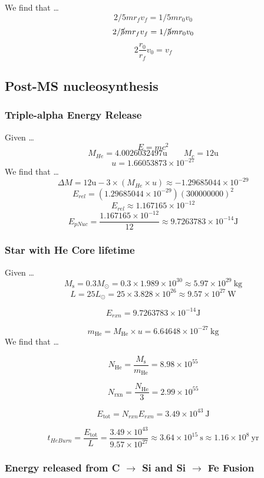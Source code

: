 \documentclass{article}
\begin{document}
We find that \dots
\[2/5 mr_f v_f = 1/5 mr_0 v_0\]
\[2/\cancel{5} mr_f v_f = 1/\cancel{5} mr_0 v_0\]
\[\boxed{2\frac{r_0}{r_f} v_0 = v_f}\]

\subsection{Post-MS nucleosynthesis}
\subsubsection{Triple-alpha Energy Release}
Given \dots
\[E = mc^2\]
\[M_{He} = 4.0026032497 \text{u} \qquad M_c = 12\text{u}\]
\[u = 1.66053873 \times 10^{-27}\]
We find that \dots
\[\Delta M = 12\text{u} - 3 \times (M_{He} \times u) \approx -1.29685044 \times 10^{-29}\]
\[E_{rel} = (1.29685044 \times 10^{-29})(300000000)^2\]
\[E_{rel} \approx1.167165 \times 10^{-12}\]
\[\boxed{E_{pNuc} = \frac{1.167165 \times 10^{-12}}{12} \approx 9.7263783 \times 10^{-14} \text{J}}\]

\subsubsection{Star with He Core lifetime}
Given \dots
\[
M_{\text{s}} = 0.3 M_\odot = 0.3 \times 1.989 \times 10^{30} \approx 5.97 \times 10^{29}\ \mathrm{kg}
\]
\[
L = 25 L_\odot = 25 \times 3.828 \times 10^{26} \approx 9.57 \times 10^{27}\ \mathrm{W}
\]

\[E_{rxn} = 9.7263783 \times 10^{-14} \text{J}\]

\[
m_{\mathrm{He}} = M_{\mathrm{He}} \times u = 6.64648\times10^{-27}\ \mathrm{kg}
\]
We find that \dots

\[
N_{\mathrm{He}} = \frac{M_{\text{s}}}{m_{\mathrm{He}}} = 8.98\times10^{55}
\]

\[
N_{\mathrm{rxn}} = \frac{N_{\mathrm{He}}}{3} = 2.99\times10^{55}
\]

\[
E_{\mathrm{tot}} = N_{rxn} E_{rxn} = 3.49\times10^{43}\ \mathrm{J}
\]

\[
\boxed{
t_{He Burn} = \frac{E_{\mathrm{tot}}}{L}
   = \frac{3.49\times10^{43}}{9.57\times10^{27}}
   \approx 3.64\times10^{15}\ \mathrm{s}
          \approx 1.16\times10^{8}\ \mathrm{yr}
}
\]



\subsubsection{Energy released from C \(\rightarrow\) Si and Si \(\rightarrow\) Fe Fusion}
\end{document}
